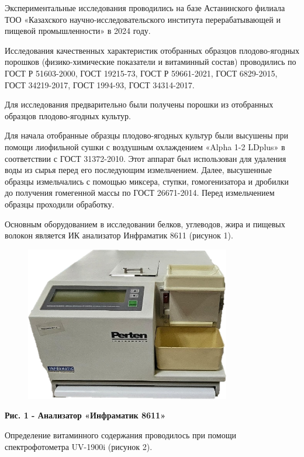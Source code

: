 {Экспериментальные исследования проводились на базе Астанинского филиала
ТОО «Казахского научно-исследовательского института перерабатывающей и
пищевой промышленности» в 2024 году.

Исследования качественных характеристик отобранных образцов
плодово-ягодных порошков (физико-химические показатели и витаминный
состав) проводились по ГОСТ Р 51603-2000, ГОСТ 19215-73, ГОСТ Р
59661-2021, ГОСТ 6829-2015, ГОСТ 34219-2017, ГОСТ 1994-93, ГОСТ
34314-2017.

Для исследования предварительно были получены порошки из отобранных
образцов плодово-ягодных культур.

Для начала отобранные образцы плодово-ягодных культур были высушены при
помощи лиофильной сушки с воздушным охлаждением «Alpha 1-2 LDplus» в
соответствии с ГОСТ 31372-2010. Этот аппарат был использован для
удаления воды из сырья перед его последующим измельчением. Далее,
высушенные образцы измельчались с помощью миксера, ступки,
гомогенизатора и дробилки до получения гомегенной массы по ГОСТ
26671-2014. Перед измельчением образцы проходили обработку.

Основным оборудованием в исследовании белков, углеводов, жира и пищевых
волокон является ИК анализатор Инфраматик 8611 (рисунок 1).

\begin{figure}[H]
	\centering
	\includegraphics[width=0.8\textwidth]{media/pish2/image18}
	\caption*{}
\end{figure}


{\bfseries Рис. 1 - Анализатор «Инфраматик 8611»}

Определение витаминного содержания проводилось при помощи
спектрофотометра UV-1900i (рисунок 2).

}
